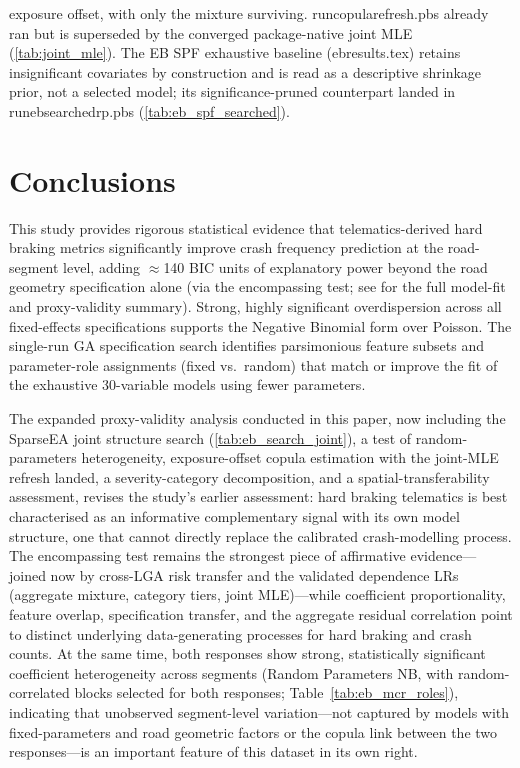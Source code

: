 \documentclass[letterpaper,8pt]{extarticle}  %
\newcommand{\file}[1]{{\ttfamily\def\_{\textunderscore\allowbreak}#1}}
\begin{document}
\begin{doublespacing}
\begin{linenumbers}
exposure offset, with only the mixture surviving. \file{run\_copula\_refresh.pbs} already ran but is superseded by the converged package-native joint MLE (\cref{tab:joint_mle}). The EB SPF exhaustive baseline (\file{eb\_results.tex}) retains insignificant covariates by construction and is read as a descriptive shrinkage prior, not a selected model; its significance-pruned counterpart landed in \file{run\_eb\_searched\_rp.pbs} (\cref{tab:eb_spf_searched}).

\section{Conclusions}\label{sec:conclusions}

This study provides rigorous statistical evidence that telematics-derived hard braking metrics significantly improve crash frequency prediction at the road-segment level, adding $\approx$140 BIC units of explanatory power beyond the road geometry specification alone (via the encompassing test; see  for the full model-fit and proxy-validity summary). Strong, highly significant overdispersion across all fixed-effects specifications supports the Negative Binomial form over Poisson. The single-run GA specification search identifies parsimonious feature subsets and parameter-role assignments (fixed vs.\ random) that match or improve the fit of the exhaustive 30-variable models using fewer parameters.

The expanded proxy-validity analysis conducted in this paper, now including the SparseEA joint structure search (\cref{tab:eb_search_joint}), a test of random-parameters heterogeneity, exposure-offset copula estimation with the joint-MLE refresh landed, a severity-category decomposition, and a spatial-transferability assessment, revises the study's earlier assessment: hard braking telematics is best characterised as an informative complementary signal with its own model structure, one that cannot directly replace the calibrated crash-modelling process.
The encompassing test remains the strongest piece of affirmative evidence---joined now by cross-LGA risk transfer and the validated dependence LRs (aggregate mixture, category tiers, joint MLE)---while coefficient proportionality, feature overlap, specification transfer, and the aggregate residual correlation point to distinct underlying data-generating processes for hard braking and crash counts. At the same time, both responses show strong, statistically significant coefficient heterogeneity across segments (Random Parameters NB, with random-correlated blocks selected for both responses; Table~\ref{tab:eb_mcr_roles}), indicating that unobserved segment-level variation---not captured by models with fixed-parameters and road geometric factors or the copula link between the two responses---is an important feature of this dataset in its own right.


\end{linenumbers}
\end{doublespacing}
\end{document}
